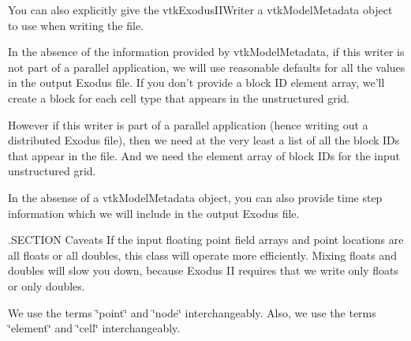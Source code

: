 You can also explicitly give the vtk\-Exodus\-I\-I\-Writer a vtk\-Model\-Metadata object to use when writing the file.

In the absence of the information provided by vtk\-Model\-Metadata, if this writer is not part of a parallel application, we will use reasonable defaults for all the values in the output Exodus file. If you don't provide a block I\-D element array, we'll create a block for each cell type that appears in the unstructured grid.

However if this writer is part of a parallel application (hence writing out a distributed Exodus file), then we need at the very least a list of all the block I\-Ds that appear in the file. And we need the element array of block I\-Ds for the input unstructured grid.

In the absense of a vtk\-Model\-Metadata object, you can also provide time step information which we will include in the output Exodus file.

.S\-E\-C\-T\-I\-O\-N Caveats If the input floating point field arrays and point locations are all floats or all doubles, this class will operate more efficiently. Mixing floats and doubles will slow you down, because Exodus I\-I requires that we write only floats or only doubles.

We use the terms \char`\"{}point\char`\"{} and \char`\"{}node\char`\"{} interchangeably. Also, we use the terms \char`\"{}element\char`\"{} and \char`\"{}cell\char`\"{} interchangeably.

